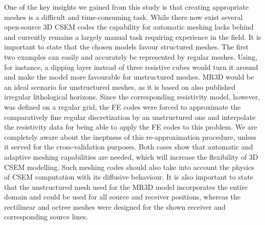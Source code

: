 \documentclass[onecolumn,extra,camera]{gji}
\begin{document}
One of the key insights we gained from this study is that creating appropriate meshes is a difficult and time-consuming task. While there now exist several open-source 3D CSEM codes the capability for automatic meshing lacks behind and currently remains a largely manual task requiring experience in the field. It is important to state that the chosen models favour structured meshes. The first two examples can easily and accurately be represented by regular meshes. Using, for instance, a dipping layer instead of three resistive cubes would turn it around and make the model more favourable for unstructured meshes. MR3D would be an ideal scenario for unstructured meshes, as it is based on also published irregular lithological horizons. Since the corresponding resistivity model, however, was defined on a regular grid, the FE codes were forced to approximate the comparatively fine regular discretization by an unstructured one and interpolate the resistivity data for being able to apply the FE codes to this problem. We are completely aware about the ineptness of this re-approximation procedure, unless it served for the cross-validation purposes. Both cases show that automatic and adaptive meshing capabilities are needed, which will increase the flexibility of 3D CSEM modelling. Such meshing codes should also take into account the physics of CSEM computation with its diffusive behaviour. It is also important to state that the unstructured mesh used for the MR3D model incorporates the entire domain and could be used for all source and receiver positions, whereas the rectilinear and octree meshes were designed for the shown receiver and corresponding source lines.
\end{document}
